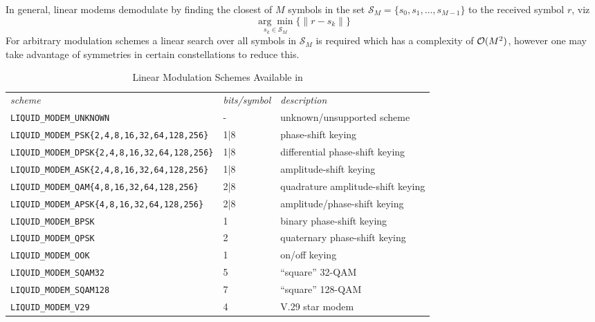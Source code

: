 In general, linear modems demodulate by finding the closest of $M$
symbols in the set $\mathcal{S}_M = \{s_0,s_1,\ldots,s_{M-1}\}$ 
to the received symbol $r$, viz
%
\begin{equation}
\label{eqn:modem:demod}
    \underset{s_k \in \mathcal{S}_M}{\arg\min}
    \bigl\{
        \| r - s_k \|
    \bigr\}
\end{equation}
%
For arbitrary modulation schemes a linear search over all symbols in
$\mathcal{S}_M$ is required which has a complexity of $\mathcal{O}(M^2)$, however one may
take advantage of symmetries in certain constellations to reduce this.

\begin{table*}
\caption{Linear Modulation Schemes Available in \liquid}
\label{tab:modem:schemes}
\centering
{\small
\begin{tabular*}{0.95\textwidth}{l@{\extracolsep{\fill}}ll}
\toprule
{\it scheme} &
{\it bits/symbol} &
{\it description}\\\otoprule
%
{\tt LIQUID\_MODEM\_UNKNOWN}                        & -     & unknown/unsupported scheme\\
{\tt LIQUID\_MODEM\_PSK\{2,4,8,16,32,64,128,256\}}  & 1|8   & phase-shift keying\\
{\tt LIQUID\_MODEM\_DPSK\{2,4,8,16,32,64,128,256\}} & 1|8   & differential phase-shift keying\\
{\tt LIQUID\_MODEM\_ASK\{2,4,8,16,32,64,128,256\}}  & 1|8   & amplitude-shift keying\\
{\tt LIQUID\_MODEM\_QAM\{4,8,16,32,64,128,256\}}    & 2|8   & quadrature amplitude-shift keying\\
{\tt LIQUID\_MODEM\_APSK\{4,8,16,32,64,128,256\}}   & 2|8   & amplitude/phase-shift keying\\\midrule
%
{\tt LIQUID\_MODEM\_BPSK}       & 1     & binary phase-shift keying\\
{\tt LIQUID\_MODEM\_QPSK}       & 2     & quaternary phase-shift keying\\
{\tt LIQUID\_MODEM\_OOK}        & 1     & on/off keying\\
{\tt LIQUID\_MODEM\_SQAM32}     & 5     & ``square'' 32-QAM\\
{\tt LIQUID\_MODEM\_SQAM128}    & 7     & ``square'' 128-QAM\\
{\tt LIQUID\_MODEM\_V29}        & 4     & V.29 star modem\\

\end{tabular*}}
\end{table*}
